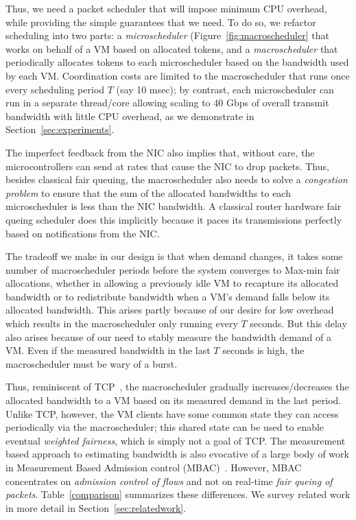 Thus, we need a packet scheduler that will impose minimum CPU overhead, while
providing the simple guarantees that we need. To do so, we refactor scheduling
into two parts: a {\em microscheduler} (Figure~\ref{fig:macroscheduler} that
works on behalf of a VM based on allocated tokens, and a {\em macroscheduler}
that periodically allocates tokens to each microscheduler based on the bandwidth
used by each VM.  Coordination costs are limited to the macroscheduler that runs
once every scheduling period $T$ (say 10 msec); by contrast, each microscheduler
can run in a separate thread/core allowing scaling to 40 Gbps of overall
transmit bandwidth with little CPU overhead, as we demonstrate in
Section~\ref{sec:experiments}.

The imperfect feedback from the NIC also implies that, without care, the
microcontrollers can send at rates that cause the NIC to drop
packets.   Thus, besides classical fair queuing, the macroscheduler also needs to
solve a {\em congestion problem} to ensure that the sum of the allocated
bandwidths to each microscheduler is less  than the NIC bandwidth.  A classical
router hardware fair queing scheduler does this implicitly because it paces its
transmissions perfectly based on notifications from the NIC.

The tradeoff we make in our design is that when demand changes, it takes some
number of macroscheduler periods before the system converges to Max-min fair
allocations, whether in allowing a previously idle VM to recapture its allocated
bandwidth or to redistribute bandwidth when a VM's demand falls below its
allocated bandwidth.  This arises partly because of our desire for low overhead
which results in the macroscheduler only running every $T$ seconds.  But this
delay also arises because of our need to stably measure the bandwidth demand of
a VM.  Even if the measured bandwidth in the last $T$ seconds is high, the
macroscheduler must be wary of a burst.

Thus, reminiscent of TCP~\cite{tcp}, the macroscheduler gradually
increases/decreases the allocated bandwidth to a VM based on its measured demand
in the last period.  Unlike TCP, however, the VM clients have some common state
they can access periodically via the macroscheduler; this shared state can be
used to enable eventual {\em weighted fairness}, which is simply not a goal of
TCP.  The measurement based approach to estimating bandwidth is also evocative
of a large body of work in Measurement Based Admission control
(MBAC)~\cite{mbac}.  However, MBAC concentrates on {\em admission control of flows} and
not on real-time {\em fair queing of packets}. Table~\ref{comparison}
summarizes these differences. We survey related work in more detail 
in Section~\ref{sec:relatedwork}.

